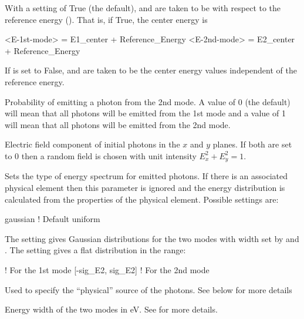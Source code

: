 {\begin{description}
  \item[\vn{E_center_relative_to_ref}] \Newline
With a setting of True (the default),  and  are taken to be with respect
to the reference energy (). That is, if True, the center energy  is
\begin{example}
  <E-1st-mode> = E1_center + Reference_Energy
  <E-2nd-mode> = E2_center + Reference_Energy
\end{example}
If  is set to False,  and  are taken to be
the center energy values independent of the reference energy.

  \item[\vn{E2_probability}] \Newline
Probability of emitting a photon from the 2nd mode. A value of 0 (the default) will mean
that all photons will be emitted from the 1st mode and a value of 1 will mean that
all photons will be emitted from the 2nd mode.

  \item[\vn{e_field_x}, \vn{e_field_y}] \Newline
Electric field component of initial photons in the $x$ and $y$ planes.
If both are set to 0 then a random field is chosen with unit intensity
$E_x^2 + E_y^2 = 1$.

  \item[\vn{energy_distribution}] \Newline
Sets the type of energy spectrum for emitted photons. If there is an associated physical element
then this parameter is ignored and the energy distribution is calculated from the properties of the
physical element. Possible settings are:
\begin{example2}
  gaussian   ! Default
  uniform
\end{example2}
The  setting gives Gaussian distributions for the two modes with width
set by  and . The  setting gives a flat
distribution in the range:
\begin{example2}
      ! For the 1st mode
  [-sig_E2, sig_E2]  ! For the 2nd mode
\end{example2}

  \item[\vn{physical_source}] \Newline
Used to specify the ``physical'' source of the photons. See below for more details

  \item[\vn{sig_E}, \vn{sig_E2}] \Newline
Energy width of the two modes in eV. See  for more
details.


\end{description}}
